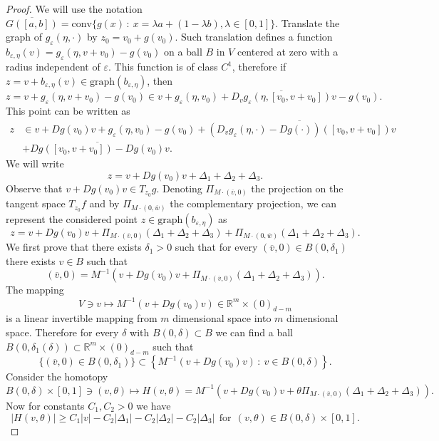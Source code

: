 \documentclass[11pt, leqno]{amsart}
\theoremstyle{definition}
\def\R{\mathbb{R}}
\begin{document}
	 \begin{proof}
	 	We will use the notation $\overline{G([a,b])} = \mathrm{conv}\{ g(x)\, :\  x = \lambda a + (1-\lambda b), \lambda\in [0,1] \}$. Translate the graph of $g_\varepsilon(\eta,\cdot)$ by $z_0=v_0+g(v_0)$. Such translation defines a function $b_{\varepsilon,\eta}(v)=g_{\varepsilon}(\eta,v+v_0)-g(v_0)$ on a ball $B$ in $V$ centered at zero with a radius independent of $\varepsilon$. This function is of class $C^1$, therefore if $z=v+b_{\varepsilon,\eta}(v)\in \text{graph}(b_{\varepsilon,\eta})$, then 
	 		$$
	 	z = v+g_\varepsilon(\eta,v+v_0)-g(v_0)\in v+g_\varepsilon(\eta,v_0)+ \overline{D_v g_\varepsilon(\eta,[v_0,v+v_0])}v-g(v_0).
	 	$$
	 	This point can be written as 
	 	\begin{align*}
	 	z & \in v+D g(v_0)v+g_\varepsilon(\eta,v_0)-g(v_0)+ \overline{\left(D_v g_\varepsilon(\eta,\cdot)-D g(\cdot)\right)([v_0,v+v_0])}v\\
	 	& +\overline{D g([v_0,v+v_0])-D g(v_0)}v.
	 	\end{align*}
	 	We will write
	 	$$z = v+D g(v_0)v + \Delta_1 + \Delta_2 + \Delta_3.
	 	$$
	 	Observe that  $v+D g(v_0)v \in T_{z_0}g$. Denoting $\Pi_{M\cdot (\overline{v},0)}$ the projection on the tangent space $T_{z_0}f$ and by $\Pi_{M\cdot (0,\overline{w})}$ the complementary projection, we can represent the considered point $z\in \text{graph}(b_{\varepsilon,\eta})$ as
	 	$$
	 	z = v+D g(v_0)v + \Pi_{M\cdot (\overline{v},0)}(\Delta_1+\Delta_2+\Delta_3) + \Pi_{M\cdot (0,\overline{w})}(\Delta_1+\Delta_2+\Delta_3).
	 	$$
	 	We first prove that there exists $\delta_1 > 0$ such that for every $(\overline{v},0) \in B(0,\delta_1)$ there exists $v\in B$ such that
	 	$$
	 	(\overline{v},0) = M^{-1} \left(v+D g(v_0)v + \Pi_{M\cdot (\overline{v},0)}(\Delta_1+\Delta_2+\Delta_3)\right).
	 	$$
	 	The mapping
	 	$$
	 	V\ni v\mapsto M^{-1} \left(v+ Dg(v_0)v  \right)\in \R^m \times (0)_{d-m}
	 	$$
	 	is a linear invertible mapping from $m$ dimensional space into $m$ dimensional space. Therefore  for every $\delta$ with $B(0,\delta) \subset B$ we can find a ball $B(0,{\delta}_1(\delta)) \subset \R^m \times (0)_{d-m}$ such that
	 	$$
	 	\{ (\overline{v},0) \in   B(0,{\delta}_1)  \} \subset \left\{ M^{-1} \left(v+D g(v_0)v \right)\, : \ v\in B(0, \delta)\right\}.
	 	$$
	 	Consider the homotopy
	 	$$
	 	B(0, \delta) \times[0,1] \ni (v,\theta ) \mapsto H(v,\theta )  =  M^{-1} \left(v+D g(v_0)v + \theta \Pi_{M\cdot (\overline{v},0)}(\Delta_1+\Delta_2+\Delta_3) \right).
	 	$$
	 	Now for constants $C_1, C_2 > 0 $ we have
	 	$$
	 	|H(v,\theta)| \geq C_1|v| - C_2|\Delta_1| - C_2|\Delta_2| - C_2|\Delta_3|\  \ \textrm{for}\ \  (v,\theta )\in B(0, \delta) \times[0,1].
$$
\end{proof}
\end{document}
